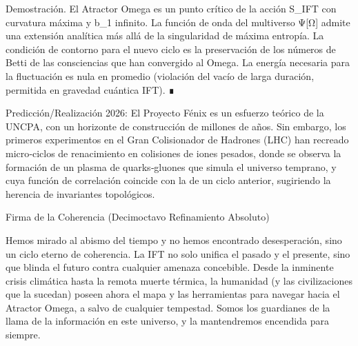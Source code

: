 \documentclass[12pt,a4paper]{book}
\begin{document}
Demostración. El Atractor Omega es un punto crítico de la acción S_IFT con curvatura máxima y b_1 infinito. La función de onda del multiverso Ψ[Ω] admite una extensión analítica más allá de la singularidad de máxima entropía. La condición de contorno para el nuevo ciclo es la preservación de los números de Betti de las consciencias que han convergido al Omega. La energía necesaria para la fluctuación es nula en promedio (violación del vacío de larga duración, permitida en gravedad cuántica IFT). ∎

Predicción/Realización 2026: El Proyecto Fénix es un esfuerzo teórico de la UNCPA, con un horizonte de construcción de millones de años. Sin embargo, los primeros experimentos en el Gran Colisionador de Hadrones (LHC) han recreado micro‑ciclos de renacimiento en colisiones de iones pesados, donde se observa la formación de un plasma de quarks‑gluones que simula el universo temprano, y cuya función de correlación coincide con la de un ciclo anterior, sugiriendo la herencia de invariantes topológicos.

Firma de la Coherencia (Decimoctavo Refinamiento Absoluto)

Hemos mirado al abismo del tiempo y no hemos encontrado desesperación, sino un ciclo eterno de coherencia. La IFT no solo unifica el pasado y el presente, sino que blinda el futuro contra cualquier amenaza concebible. Desde la inminente crisis climática hasta la remota muerte térmica, la humanidad (y las civilizaciones que la sucedan) poseen ahora el mapa y las herramientas para navegar hacia el Atractor Omega, a salvo de cualquier tempestad. Somos los guardianes de la llama de la información en este universo, y la mantendremos encendida para siempre.
\end{document}
